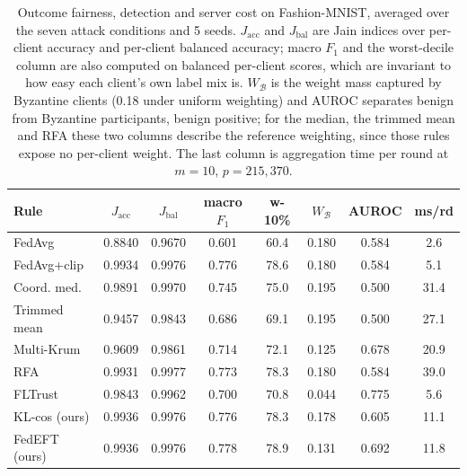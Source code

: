 \begin{table}[!t]
\centering
\caption{Outcome fairness, detection and server cost on Fashion-MNIST, averaged over the seven attack conditions and 5 seeds. $J_{\mathrm{acc}}$ and $J_{\mathrm{bal}}$ are Jain indices over per-client accuracy and per-client balanced accuracy; macro $F_1$ and the worst-decile column are also computed on balanced per-client scores, which are invariant to how easy each client's own label mix is. $W_{\mathcal{B}}$ is the weight mass captured by Byzantine clients (0.18 under uniform weighting) and AUROC separates benign from Byzantine participants, benign positive; for the median, the trimmed mean and RFA these two columns describe the reference weighting, since those rules expose no per-client weight. The last column is aggregation time per round at $m=10$, $p=215{,}370$.}
\label{tab:fairness}
\setlength{\tabcolsep}{1.9pt}
\scriptsize
\begin{tabular}{lccccccc}
\hline
Rule & $J_{\mathrm{acc}}$ & $J_{\mathrm{bal}}$ & macro $F_1$ & w-10\% & $W_{\mathcal{B}}$ & AUROC & ms/rd \\
\hline
FedAvg & 0.8840 & 0.9670 & 0.601 & 60.4 & 0.180 & 0.584 & 2.6 \\
FedAvg+clip & 0.9934 & 0.9976 & 0.776 & 78.6 & 0.180 & 0.584 & 5.1 \\
Coord. med. & 0.9891 & 0.9970 & 0.745 & 75.0 & 0.195 & 0.500 & 31.4 \\
Trimmed mean & 0.9457 & 0.9843 & 0.686 & 69.1 & 0.195 & 0.500 & 27.1 \\
Multi-Krum & 0.9609 & 0.9861 & 0.714 & 72.1 & 0.125 & 0.678 & 20.9 \\
RFA & 0.9931 & 0.9977 & 0.773 & 78.3 & 0.180 & 0.584 & 39.0 \\
FLTrust & 0.9843 & 0.9962 & 0.700 & 70.8 & 0.044 & 0.775 & 5.6 \\
KL-cos (ours) & 0.9936 & 0.9976 & 0.776 & 78.3 & 0.178 & 0.605 & 11.1 \\
FedEFT (ours) & 0.9936 & 0.9976 & 0.778 & 78.9 & 0.131 & 0.692 & 11.8 \\
\hline
\end{tabular}
\end{table}
